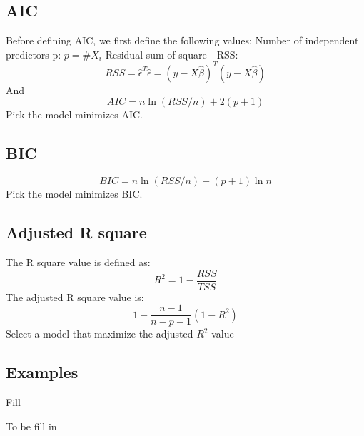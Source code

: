 \documentclass[a4paper, 11pt]{article}
\begin{document}
\subsection{AIC}
Before defining AIC, we first define the following values: \newline
Number of independent predictors p: $p = \# X_i$ \newline
Residual sum of square - RSS: \begin{equation}
    RSS = \hat{\epsilon}^T\hat{\epsilon} = (y - X\hat\beta)^T(y - X\hat\beta)
\end{equation}
And
\begin{equation}
    AIC = n \ln{(RSS/n)} + 2(p+1)
\end{equation}
Pick the model minimizes AIC.
\subsection{BIC}
\begin{equation}
    BIC = n \ln{(RSS/n)} + (p+1)\ln n
\end{equation}
Pick the model minimizes BIC.
\subsection{Adjusted R square}
The R square value is defined as:
\begin{equation}
    R^2 = 1 - \frac{RSS}{TSS}
\end{equation}
The adjusted R square value is:
\begin{equation}
    1 - \frac{n-1}{n-p-1}(1 - R^2)
\end{equation}
Select a model that maximize the adjusted $R^2$ value 
\subsection{Examples}
Fill

\begin{thebibliography}{9}

\end{thebibliography}
To be fill in
\end{document}
